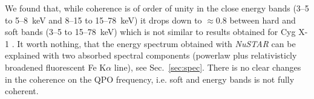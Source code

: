 \documentclass[a4paper,fleqn,usenatbib]{mnras}
\begin{document}
We found that, while coherence is of order of unity in the close energy bands (3--5 to 5--8~keV and 8--15 to 15--78~keV) it drops down to $\approx0.8$ between hard and soft bands (3--5 to 15--78~keV) which is not similar to results obtained for Cyg X-1 \citep{nowak99}.
It worth nothing, that the energy spectrum obtained with {\it NuSTAR} can be explained with two absorbed spectral components (powerlaw plus relativisticly broadened fluorescent Fe K$\alpha$ line), see Sec.~\ref{sec:spec}.
There is no clear changes in the coherence on the QPO frequency, i.e. soft and energy bands is not fully coherent. %





\end{document}
